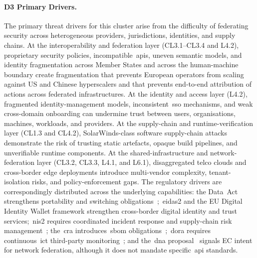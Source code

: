 \documentclass{ieeeaccess}
\begin{document}
\paragraph{D3 Primary Drivers.}
The primary threat drivers for this cluster arise from the difficulty of federating security across heterogeneous providers, jurisdictions, identities, and supply chains. At the interoperability and federation layer (CL3.1--CL3.4 and L4.2), proprietary security policies, incompatible~\glspl{api}, uneven semantic models, and identity fragmentation across Member States and across the human-machine boundary create fragmentation that prevents European operators from scaling against US and Chinese hyperscalers and that prevents end-to-end attribution of actions across federated infrastructures. At the identity and access layer (L4.2), fragmented identity-management models, inconsistent~\gls{sso} mechanisms, and weak cross-domain onboarding can undermine trust between users, organisations, machines, workloads, and providers. At the supply-chain and runtime-verification layer (CL1.3 and CL4.2), SolarWinds-class software supply-chain attacks demonstrate the risk of trusting static artefacts, opaque build pipelines, and unverifiable runtime components. At the shared-infrastructure and network-federation layer (CL3.2, CL3.3, L4.1, and L6.1), disaggregated telco clouds and cross-border edge deployments introduce multi-vendor complexity, tenant-isolation risks, and policy-enforcement gaps. The regulatory drivers are correspondingly distributed across the underlying capabilities: the Data~Act strengthens portability and switching obligations~\cite{eudataact};~\gls{eidas2} and the EU Digital Identity Wallet framework strengthen cross-border digital identity and trust services;~\gls{nis2} requires coordinated incident response and supply-chain risk management~\cite{eunis2}; the~\gls{cra} introduces~\gls{sbom} obligations~\cite{eucra2024};~\gls{dora} requires continuous~\gls{ict} third-party monitoring~\cite{eudora}; and the~\gls{dna} proposal~\cite{eudna2026} signals EC intent for network federation, although it does not mandate specific~\gls{api} standards.
\end{document}
